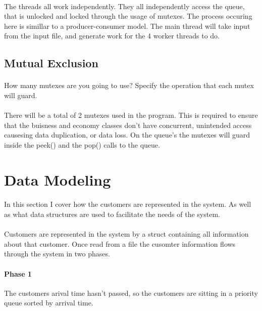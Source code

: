 \documentclass[12pt, letterpaper]{article}
\begin{document}
\paragraph{}
The threads all work independently. They all independently access the queue, that is unlocked and locked through the usage of mutexes. The process occuring here is simillar to a producer-consumer model. The main thread will take input from the input file, and generate work for the 4 worker threads to do.

\subsection{Mutual Exclusion}
\paragraph{}
How many mutexes are you going to use? Specify the operation that each mutex will guard.

\paragraph{}
There will be a total of 2 mutexes used in the program. This is required to ensure that the buisness and economy classes don't have concurrent, unintended access causesing data duplication, or data loss. On the queue's the mutexes will guard inside the peek() and the pop() calls to the queue.

\section{Data Modeling}

\paragraph{}
In this section I cover how the customers are represented in the system. As well as what data structures are used to facilitate the needs of the system.

\paragraph{}
Customers are represented in the system by a struct containing all information about that customer. Once read from a file the cusomter information flows through the system in two phases.

\paragraph{Phase 1}
The customers arival time hasn't passed, so the customers are sitting in a priority queue sorted by arrival time.
\end{document}
